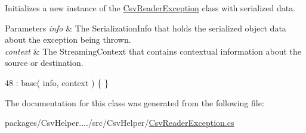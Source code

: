 Initializes a new instance of the \hyperlink{a00058}{Csv\-Reader\-Exception} class with serialized data. 


\begin{DoxyParams}{Parameters}
{\em info} & The Serialization\-Info that holds the serialized object data about the exception being thrown.\\
\hline
{\em context} & The Streaming\-Context that contains contextual information about the source or destination.\\
\hline
\end{DoxyParams}

\begin{DoxyCode}
48 : base( info, context ) \{ \}
\end{DoxyCode}


The documentation for this class was generated from the following file\-:\begin{DoxyCompactItemize}
\item 
packages/\-Csv\-Helper..../src/\-Csv\-Helper/\hyperlink{a00204}{Csv\-Reader\-Exception.\-cs}\end{DoxyCompactItemize}
